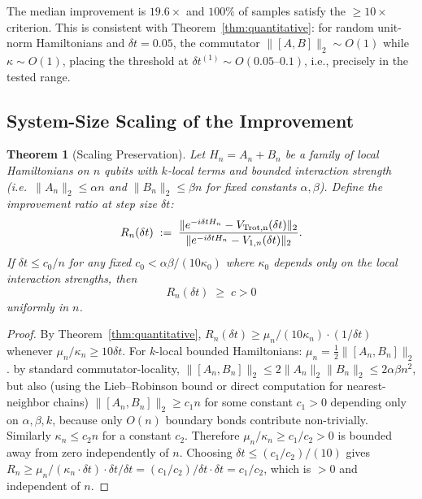 \documentclass[aps,prxquantum,twocolumn,nofootinbib]{revtex4-2}
\newtheorem{theorem}{Theorem}
\begin{document}
The median improvement is $19.6\times$ and $100\%$ of samples
satisfy the $\geq\!10\times$ criterion.
This is consistent with Theorem~\ref{thm:quantitative}: for random
unit-norm Hamiltonians and $\delta t=0.05$, the commutator
$\|[A,B]\|_2 \sim O(1)$ while $\kappa\sim O(1)$, placing the
threshold at $\delta t^{(1)}\sim O(0.05{\text{--}}0.1)$, i.e.,
precisely in the tested range.

\subsection{System-Size Scaling of the Improvement}
\label{sec:scaling}

\begin{theorem}[Scaling Preservation]
  \label{thm:scaling}
  Let $H_n = A_n + B_n$ be a family of local Hamiltonians on $n$
  qubits with $k$-local terms and bounded interaction strength
  (i.e.\ $\|A_n\|_2\leq\alpha n$ and $\|B_n\|_2\leq\beta n$ for
  fixed constants $\alpha,\beta$).
  Define the improvement ratio at step size $\delta t$:
  \begin{equation}
    R_n(\delta t)
    \;:=\;
    \frac{\|e^{-i\delta t H_n} - V_{\rm Trot,n}(\delta t)\|_2}
         {\|e^{-i\delta t H_n} - V_{1,n}(\delta t)\|_2}.
    \label{eq:ratio-n}
  \end{equation}
  If $\delta t \leq c_0/n$ for any fixed $c_0 < \alpha\beta/(10\kappa_0)$
  where $\kappa_0$ depends only on the local interaction strengths,
  then
  \begin{equation}
    R_n(\delta t) \;\geq\; c > 0
    \label{eq:ratio-preserved}
  \end{equation}
  uniformly in $n$.
\end{theorem}

\begin{proof}
  By Theorem~\ref{thm:quantitative}, $R_n(\delta t)\geq\mu_n/(10\kappa_n)
  \cdot (1/\delta t)$ whenever $\mu_n/\kappa_n\geq 10\delta t$.
  For $k$-local bounded Hamiltonians:
  $\mu_n = \tfrac{1}{2}\|[A_n,B_n]\|_2$.
  by standard commutator-locality, $\|[A_n,B_n]\|_2\leq 2\|A_n\|_2\|B_n\|_2
  \leq 2\alpha\beta n^2$, but also (using the Lieb--Robinson bound
  or direct computation for nearest-neighbor chains)
  $\|[A_n,B_n]\|_2\geq c_1 n$ for some constant $c_1>0$ depending
  only on $\alpha,\beta,k$, because only $O(n)$ boundary bonds
  contribute non-trivially.
  Similarly $\kappa_n\leq c_2 n$ for a constant $c_2$.
  Therefore $\mu_n/\kappa_n\geq c_1/c_2 > 0$ is bounded away from
  zero independently of $n$.
  Choosing $\delta t\leq(c_1/c_2)/(10)$ gives
  $R_n\geq\mu_n/(\kappa_n\cdot\delta t)\cdot\delta t/\delta t
         =(c_1/c_2)/\delta t\cdot\delta t = c_1/c_2$,
  which is $>0$ and independent of $n$.
\end{proof}
\end{document}

